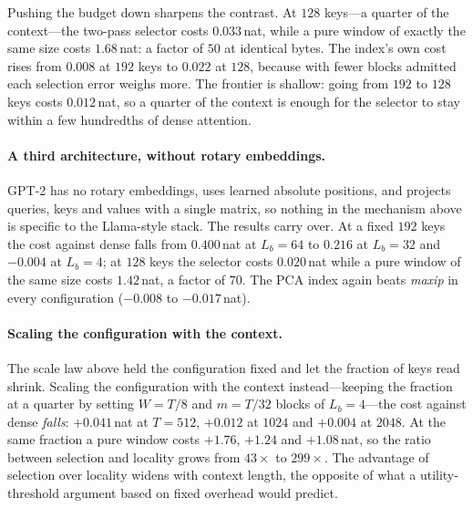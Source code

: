 \documentclass[sigconf,nonacm,11pt]{acmart}
\begin{document}
Pushing the budget down sharpens the contrast. At $128$ keys---a quarter of the
context---the two-pass selector costs $0.033$\,nat, while a pure window of exactly
the same size costs $1.68$\,nat: a factor of $50$ at identical bytes. The index's
own cost rises from $0.008$ at $192$ keys to $0.022$ at $128$, because with fewer
blocks admitted each selection error weighs more. The frontier is shallow: going
from $192$ to $128$ keys costs $0.012$\,nat, so a quarter of the context is enough
for the selector to stay within a few hundredths of dense attention.

\paragraph{A third architecture, without rotary embeddings.} GPT-2 has no rotary
embeddings, uses learned absolute positions, and projects queries, keys and values
with a single matrix, so nothing in the mechanism above is specific to the
Llama-style stack. The results carry over. At a fixed $192$ keys the cost against
dense falls from $0.400$\,nat at $L_b=64$ to $0.216$ at $L_b=32$ and $-0.004$ at
$L_b=4$; at $128$ keys the selector costs $0.020$\,nat while a pure window of the
same size costs $1.42$\,nat, a factor of $70$. The PCA index again beats
\emph{maxip} in every configuration ($-0.008$ to $-0.017$\,nat).

\paragraph{Scaling the configuration with the context.} The scale law above held
the configuration fixed and let the fraction of keys read shrink. Scaling the
configuration with the context instead---keeping the fraction at a quarter by
setting $W=T/8$ and $m=T/32$ blocks of $L_b=4$---the cost against dense
\emph{falls}: $+0.041$\,nat at $T=512$, $+0.012$ at $1024$ and $+0.004$ at
$2048$. At the same fraction a pure window costs $+1.76$, $+1.24$ and $+1.08$\,nat,
so the ratio between selection and locality grows from $43\times$ to $299\times$.
The advantage of selection over locality widens with context length, the opposite
of what a utility-threshold argument based on fixed overhead would predict.
\end{document}
